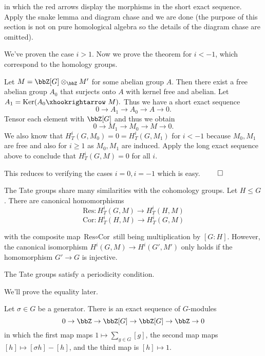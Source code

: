 \documentclass[a4paper, 12pt,oneside,openany]{book}
\begin{document}
in which the red arrows display the morphisms in the short exact sequence. Apply the snake lemma and diagram chase and we are done (the purpose of this section is not on pure homological algebra so the details of the diagram chase are omitted).


 We've proven the case $i>1$. Now we prove the theorem for $i<-1$, which correspond to the homology groups.

Let $M = \bbZ[G] \otimes_\bbZ M'$ for some abelian group $A$. Then there exist a free abelian group $A_0$ that surjects onto $A$ with kernel free and abelian. Let $A_1 = \text{Ker}(A_0 \xhookrightarrow\ M).$ Thus we have a short exact sequence $$0 \to A_1 \to A_0 \to A \to 0.$$ Tensor each element with $\bbZ[G]$ and thus we obtain $$0 \to M_1 \to M_0 \to M \to 0.$$ We also know that $H_T^i(G, M_0)=0 = H_T^i(G, M_1)$ for $i<-1$ because $M_0, M_1$ are free and also for $i \geq 1$ as $M_0, M_1$ are induced. Apply the long exact sequence above to conclude that $H_T^i(G, M)=0$ for all $i$. 

This reduces to verifying the cases $i=0, i=-1$ which is easy. $\qed$

The Tate groups share many similarities with the cohomology groups. Let $H \leq G$. There are canonical homomorphisms $$\text{Res}: H_T^i(G, M) \to H_T^i(H, M)$$ $$\text{Cor}: H_T^i(H, M) \to H_T^i(G, M)$$

with the composite map $\text{Res} \circ \text{Cor}$ still being multiplication by $[G:H]$. However, the canonical isomorphism $H^i(G, M) \to H^i(G', M')$ only holds if the homomorphism $G' \to G$ is injective. 

The Tate groups satisfy a periodicity condition. 


We'll prove the equality later.


 Let $\sigma \in G$ be a generator. There is an exact sequence of $G$-modules $$0 \to \bbZ \to \bbZ[G] \to \bbZ[G] \to \bbZ \to 0$$ in which the first map maps $1 \mapsto \sum\limits_{g \in G} [g]$, the second map maps $[h] \mapsto [\sigma h]-[h]$, and the third map is $[h] \mapsto 1$. 
\end{document}

